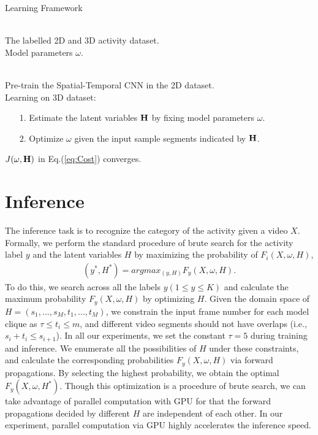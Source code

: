 \documentclass{sig-alternate}
\newcommand{\INPUT}{\item[\myinput]}
\newcommand{\myinput}{\textbf{Initialization:}}
\newcommand{\MYWHILE}{\item[\mywhile]}
\newcommand{\mywhile}{\textbf{repeat}}
\newcommand{\MYENDWHILE}{\item[\myendwhile]}
\newcommand{\myendwhile}{\textbf{until}}
\begin{document}
\begin{small}
\begin{algorithm}[htb]
\caption{Learning Framework}
\label{alg:Framwork}
\begin{algorithmic}\footnotesize
\REQUIRE ~~\\
    The labelled 2D and 3D activity dataset.
\ENSURE ~~\\
    Model parameters $\omega$.

\INPUT ~~\\
    Pre-train the Spatial-Temporal CNN in the 2D dataset.
    \\
\vspace{0.5em}
\hspace{-1.5em} Learning on 3D dataset:
\MYWHILE
    \STATE
    \begin{itemize}
\setlength{\itemsep}{1pt}
 \setlength{\parskip}{0pt}
 \setlength{\parsep}{10pt}
      \item[1.] Estimate the latent variables ${\bf{H}}$ by fixing model parameters $\omega$.
      \item[2.] Optimize $\omega$ given the input sample segments indicated by ${\bf{H}}$.
    \end{itemize}
\MYENDWHILE{$J(\omega,{\bf{H}})$ in Eq.(\ref{eq:Cost}) converges. }

\end{algorithmic}
\end{algorithm}
\end{small}

\section{Inference}

The inference task is to recognize the category of the activity given a video $X$. Formally, we perform the standard procedure of brute search for the activity label $y$ and the latent variables $H$ by maximizing the probability of $F_i(X,\omega,H)$,
\begin{eqnarray} \label{eq:inference}
(y^{*},H^{*}) = argmax_{(y,H)} F_y(X,\omega,H).
\end{eqnarray}
To do this, we search across all the labels $y(1 \leq y \leq K)$ and calculate the maximum probability $F_y(X,\omega,H)$ by optimizing $H$. Given the domain space of $H=(s_1,...,s_M, t_1,...,t_M)$, we constrain the input frame number for each model clique as $\tau \leq t_i \leq m$, and different video segments should not have overlaps (i.e., $s_i + t_i \leq s_{i+1}$). In all our experiments, we set the constant $\tau= 5$ during training and inference. We enumerate all the possibilities of $H$ under these constraints, and calculate the corresponding probabilities $F_y(X,\omega,H)$ via forward propagations. By selecting the highest probability, we obtain the optimal $F_y(X,\omega,H^{*})$. Though this optimization is a procedure of brute search, we can take advantage of parallel computation with GPU for that the forward propagations decided by different $H$ are independent of each other. In our experiment, parallel computation via GPU highly accelerates the inference speed.
\end{document}

